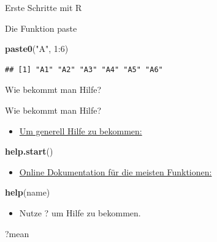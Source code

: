 \documentclass[ignorenonframetext,]{beamer}
\newenvironment{Shaded}{}{}
\newcommand{\KeywordTok}[1]{\textcolor[rgb]{0.00,0.44,0.13}{\textbf{{#1}}}}
\newcommand{\DecValTok}[1]{\textcolor[rgb]{0.25,0.63,0.44}{{#1}}}
\newcommand{\StringTok}[1]{\textcolor[rgb]{0.25,0.44,0.63}{{#1}}}
\newcommand{\NormalTok}[1]{{#1}}
\providecommand{\tightlist}{%
\setlength{\itemsep}{0pt}\setlength{\parskip}{0pt}}
\begin{document}
\begin{frame}[fragile]{Erste Schritte mit R}
\begin{block}{Die Funktion paste}
\begin{Shaded}
\begin{Highlighting}[]
\KeywordTok{paste0}\NormalTok{(}\StringTok{"A"}\NormalTok{, }\DecValTok{1}\NormalTok{:}\DecValTok{6}\NormalTok{)}
\end{Highlighting}
\end{Shaded}

\begin{verbatim}
## [1] "A1" "A2" "A3" "A4" "A5" "A6"
\end{verbatim}

\end{block}

\end{frame}

\begin{frame}[fragile]{Wie bekommt man Hilfe?}

\begin{block}{Wie bekommt man Hilfe?}

\begin{itemize}
\tightlist
\item
  \href{http://itfeature.com/tag/how-to-get-help-in-r}{Um generell Hilfe
  zu bekommen:}
\end{itemize}

\begin{Shaded}
\begin{Highlighting}[]
\KeywordTok{help.start}\NormalTok{()}
\end{Highlighting}
\end{Shaded}

\begin{itemize}
\tightlist
\item
  \href{https://www.r-project.org/help.html}{Online Dokumentation für
  die meisten Funktionen:}
\end{itemize}

\begin{Shaded}
\begin{Highlighting}[]
\KeywordTok{help}\NormalTok{(name)}
\end{Highlighting}
\end{Shaded}

\begin{itemize}
\tightlist
\item
  Nutze ? um Hilfe zu bekommen.
\end{itemize}

\begin{Shaded}
\begin{Highlighting}[]
\NormalTok{?mean}
\end{Highlighting}
\end{Shaded}


\end{block}
\end{frame}
\end{document}
